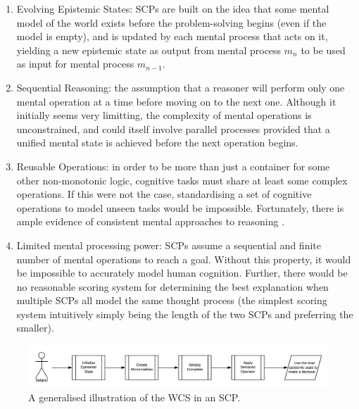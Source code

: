 \documentclass{article}
\begin{document}
\begin{enumerate}
\item Evolving Epistemic States: SCPs are built on the idea that some mental model of the world exists before the problem-solving begins (even if the model is empty), and is updated by each mental process that acts on it, yielding a new epistemic state as output from mental process $m_n$ to be used as input for mental process $m_{n-1}$.
\item Sequential Reasoning: the assumption that a reasoner will perform only one mental operation at a time before moving on to the next one. Although it initially seems very limitting, the complexity of mental operations is unconstrained, and could itself involve parallel processes provided that a unified mental state is achieved before the next operation begins.
\item Reusable Operations: in order to be more than just a container for some other non-monotonic logic, cognitive tasks must share at least some complex operations. If this were not the case, standardising a set of cognitive operations to model unseen tasks would be impossible. Fortunately, there is ample evidence of consistent mental approaches to reasoning \citep{ragni2017formal}.
\item Limited mental processing power: SCPs assume a sequential and finite number of mental operations to reach a goal. Without this property, it would be impossible to accurately model human cognition. Further, there would be no reasonable scoring system for determining the best explanation when multiple SCPs all model the same thought process (the simplest scoring system intuitively simply being the length of the two SCPs and preferring the smaller).
\end{enumerate}

\begin{figure}
\begin{center}
 \centering \includegraphics[scale=0.65]{suppressionSCP_overview}
\caption{A generalised illustration of the WCS in an SCP. }
\label {fig:supoverview}
\end{center}
\end{figure}
\end{document}
